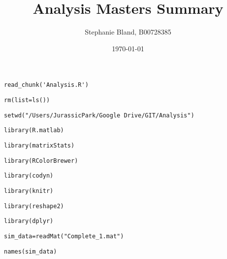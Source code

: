 \documentclass{article}\usepackage[]{graphicx}\usepackage[]{color}
\title{Analysis Masters Summary}
\author{Stephanie Bland, B00728385}
\date{\today}
\makeatletter
\newenvironment{kframe}{%
 \def\at@end@of@kframe{}%
 \ifinner\ifhmode%
  \def\at@end@of@kframe{\end{minipage}}%
  \begin{minipage}{\columnwidth}%
 \fi\fi%
 \def\FrameCommand##1{\hskip\@totalleftmargin \hskip-\fboxsep
 \colorbox{shadecolor}{##1}\hskip-\fboxsep
     \hskip-\linewidth \hskip-\@totalleftmargin \hskip\columnwidth}%
 \MakeFramed {\advance\hsize-\width
   \@totalleftmargin\z@ \linewidth\hsize
   \@setminipage}}%
 {\par\unskip\endMakeFramed%
 \at@end@of@kframe}
\newenvironment{knitrout}{}{} %
\makeatother
\begin{document}
\maketitle

\begin{knitrout}
\color{fgcolor}\begin{kframe}
\begin{lstlisting}[style=printcode]
	read_chunk('Analysis.R')\end{lstlisting}
\end{kframe}
\end{knitrout}
\begin{knitrout}
\color{fgcolor}\begin{kframe}
\begin{lstlisting}[style=printcode]
rm(list=ls())\end{lstlisting}
\begin{lstlisting}[style=printcode]
setwd("/Users/JurassicPark/Google Drive/GIT/Analysis")\end{lstlisting}
\begin{lstlisting}[style=printcode]
library(R.matlab)\end{lstlisting}
\begin{lstlisting}[style=printcode]
library(matrixStats)\end{lstlisting}
\begin{lstlisting}[style=printcode]
library(RColorBrewer)\end{lstlisting}
\begin{lstlisting}[style=printcode]
library(codyn)\end{lstlisting}
\begin{lstlisting}[style=printcode]
library(knitr)\end{lstlisting}
\begin{lstlisting}[style=printcode]
library(reshape2)\end{lstlisting}
\begin{lstlisting}[style=printcode]
library(dplyr)\end{lstlisting}
\begin{lstlisting}[style=printcode]
sim_data=readMat("Complete_1.mat")\end{lstlisting}
\begin{lstlisting}[style=printcode]
names(sim_data)\end{lstlisting}
\begin{lstlisting}[style=printcode]

\end{lstlisting}
\end{kframe}
\end{knitrout}
\end{document}
